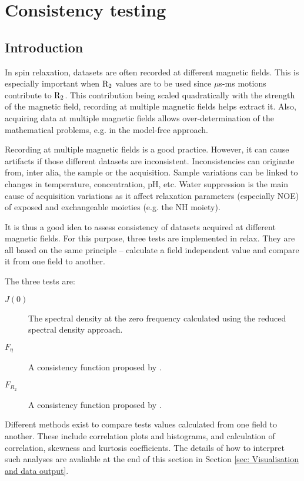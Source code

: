 
\chapter{Consistency testing}



\section{Introduction}

In spin relaxation, datasets are often recorded at different magnetic fields.  This is especially important when $\mathrm{R}_2$ values are to be used since $\mu$s-ms motions contribute to $\mathrm{R}_2$.  This contribution being scaled quadratically with the strength of the magnetic field, recording at multiple magnetic fields helps extract it.  Also, acquiring data at multiple magnetic fields allows over-determination of the mathematical problems, e.g. in the model-free approach.

Recording at multiple magnetic fields is a good practice.  However, it can cause artifacts if those different datasets are inconsistent.  Inconsistencies can originate from, inter alia, the sample or the acquisition.  Sample variations can be linked to changes in temperature, concentration, pH, etc.  Water suppression is the main cause of acquisition variations as it affect relaxation parameters (especially NOE) of exposed and exchangeable moieties (e.g. the NH moiety).

It is thus a good idea to assess consistency of datasets acquired at different magnetic fields.  For this purpose, three tests are implemented in relax.  They are all based on the same principle -- calculate a field independent value and compare it from one field to another.

The three tests are:

\begin{description}
\item[$J(0)$]  The spectral density at the zero frequency calculated using the reduced spectral density approach.
\item[$F_\eta$]  A consistency function proposed by \citet{Fushman98}.
\item[$F_{R_2}$]  A consistency function proposed by \citet{Fushman98}.
\end{description}

Different methods exist to compare tests values calculated from one field to another.  These include correlation plots and histograms, and calculation of correlation, skewness and kurtosis coefficients. The details of how to interpret such analyses are avaliable at the end of this section in Section \ref{sec: Visualisation and data output}.

